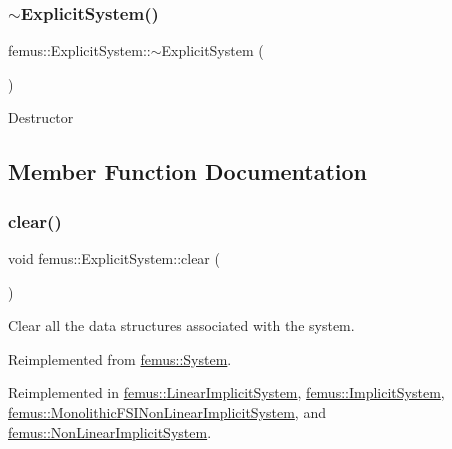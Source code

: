 \subsubsection{\texorpdfstring{$\sim$\+Explicit\+System()}{~ExplicitSystem()}}
{\footnotesize\ttfamily femus\+::\+Explicit\+System\+::$\sim$\+Explicit\+System (\begin{DoxyParamCaption}{ }\end{DoxyParamCaption})\hspace{0.3cm}{\ttfamily [virtual]}}

Destructor 

\subsection{Member Function Documentation}
\mbox{\label{classfemus_1_1_explicit_system_ac078fbc3f758429e8a60dac487aab5ce}} 
\subsubsection{\texorpdfstring{clear()}{clear()}}
{\footnotesize\ttfamily void femus\+::\+Explicit\+System\+::clear (\begin{DoxyParamCaption}{ }\end{DoxyParamCaption})\hspace{0.3cm}{\ttfamily [virtual]}}

Clear all the data structures associated with the system. 

Reimplemented from \mbox{\hyperlink{classfemus_1_1_system_ad1a19dbff3cea3d496cdb530ea2bca19}{femus\+::\+System}}.



Reimplemented in \mbox{\hyperlink{classfemus_1_1_linear_implicit_system_ace039665432e53db0c25b0efede44a76}{femus\+::\+Linear\+Implicit\+System}}, \mbox{\hyperlink{classfemus_1_1_implicit_system_a0d5395e6a8de6625f9059384b990f83f}{femus\+::\+Implicit\+System}}, \mbox{\hyperlink{classfemus_1_1_monolithic_f_s_i_non_linear_implicit_system_ac7f2bedf4d1c6b00f5443cb5128a3069}{femus\+::\+Monolithic\+F\+S\+I\+Non\+Linear\+Implicit\+System}}, and \mbox{\hyperlink{classfemus_1_1_non_linear_implicit_system_afc52f569e5be8c3bf593a00c883d7192}{femus\+::\+Non\+Linear\+Implicit\+System}}.

\mbox{\label{classfemus_1_1_explicit_system_a6736fef684fe763b26e016ff3f8b37b7}} 
